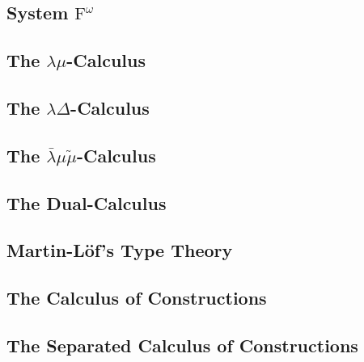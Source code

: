 \documentclass{article}
\newcommand{\LBMMT}[0]{\bar{\lambda}\mu\tilde\mu}
\begin{document}
\newpage
\subsection{System $\text{F}^\omega$}
\label{subsec:system_fw}
\Fwall{}

\newpage
\subsection{The $\lambda\mu$-Calculus}
\label{subsec:lamu_all}
\Lamuall{}

\newpage
\subsection{The $\lambda\Delta$-Calculus}
\label{subsec:lamd_all}
\Lamdall{}

\newpage
\subsection{The $\LBMMT$-Calculus}
\label{subsec:lbmmt_all}
\LBMMTall{}

\newpage
\subsection{The Dual-Calculus}
\label{subsec:dc_all}
\DCall{}

\newpage
\subsection{Martin-L\"of's Type Theory}
\label{subsec:tt_all}
\TTall{}

\newpage
\subsection{The Calculus of Constructions}
\label{subsec:coc_all}
\CoCall{}

\newpage
\subsection{The Separated Calculus of Constructions}
\label{subsec:coc_sep_all}
\CoCSall{}
\end{document}
